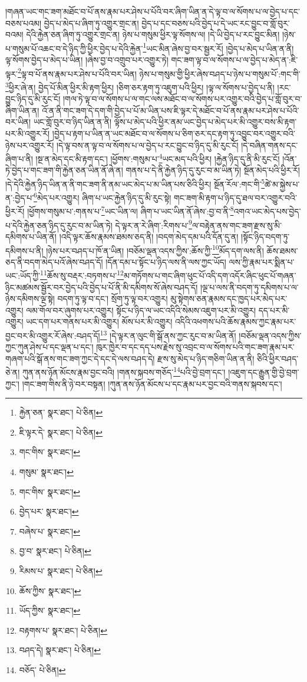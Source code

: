 །གཞན་ཡང་གང་ཟག་མཐོང་བ་པོ་ནས་རྣམ་པར་ཤེས་པ་པོའི་བར་ཞིག་ཡིན་ན་དེ་ལྟ་བ་ལ་སོགས་པ་ལ་བྱེད་པ་དང་བཅས་པའམ། བྱེད་པ་མེད་པ་ཞིག་ཏུ་འགྱུར་གྲང་ན། བྱེད་པ་དང་བཅས་པའི་བྱེད་པ་དེ་ཡང་རང་བྱུང་བ་གློ་བུར་བའམ། དེའི་རྐྱེན་ཅན་ཞིག་ཏུ་འགྱུར་གྲང་ན། ཉེས་པ་གསུམ་ཕྱིར་ལྟ་སོགས་ལ། །དེ་ཡི་བྱེད་པ་རང་བྱུང་མིན། །ཉེས་པ་གསུམ་པོ་འཆང་བ་དེ་ཉིད་ཀྱི་ཕྱིར་བྱེད་པ་དེའི་རྐྱེན་\footnote{རྐྱེན་ཅན་  སྣར་ཐང་།  པེ་ཅིན། }ཡང་མིན་ཞེས་བྱ་བར་སྦྱར་རོ། །བྱེད་པ་མེད་པ་ཡིན་ན་ནི། ལྟ་སོགས་བྱེད་པ་མེད་པ་ཡིན། །ཞེས་བྱ་བ་འགྲུབ་པར་འགྱུར་ཏེ། གང་ཟག་ལྟ་བ་ལ་སོགས་པ་ལ་བྱེད་པ་མེད་ན་:ཇི་ལྟར་\footnote{ཇི་ལྟར་དེ་  སྣར་ཐང་།  པེ་ཅིན། }ལྟ་བ་པོ་ནས་རྣམ་པར་ཤེས་པ་པོའི་བར་ཡིན། ཉེས་པ་གསུམ་གྱི་ཕྱིར་ཞེས་བཤད་པ་ཉེས་པ་གསུམ་པོ་:གང་གི་\footnote{གང་གིས་  སྣར་ཐང་། }ཕྱིར་ཞེ་ན། བྱེད་པོ་མིན་ཕྱིར་མི་རྟག་ཕྱིར། །ཅིག་ཅར་རྟག་ཏུ་འཇུག་པའི་ཕྱིར། །ལྟ་ལ་སོགས་པ་བྱེད་པ་ནི། །རང་བྱུང་ཉིད་དུ་མི་རུང་ངོ། །གལ་ཏེ་ལྟ་བ་ལ་སོགས་པ་ལ་གང་ལས་མཐོང་བ་ལ་སོགས་པར་འགྱུར་བའི་བྱེད་པ་གློ་བུར་བ་ཞིག་ཡིན་ན། འོ་ན་ནི་གང་ཟག་དེ་དག་གི་བྱེད་པ་པོ་མ་ཡིན་པས་ཇི་ལྟར་དེ་མཐོང་བ་པོ་ནས་རྣམ་པར་ཤེས་པ་པོའི་བར་ཡིན། ཡང་གློ་བུར་བ་ཉིད་ཡིན་ན་ནི། ལྟོས་པ་མེད་པའི་ཕྱིར་ནམ་ཡང་བྱེད་པ་མེད་པར་མི་འགྱུར་བས་མི་རྟག་པར་མི་འགྱུར་རོ། །བྱེད་པ་རྟག་པ་ཡིན་ན་ཡང་མཐོང་བ་ལ་སོགས་པ་ཅིག་ཅར་དང་རྟག་ཏུ་འབྱུང་བར་འགྱུར་བའི་ཉེས་པར་འགྱུར་རོ། །དེ་ལྟ་བས་ན་ལྟ་བ་ལ་སོགས་པ་ལ་བྱེད་པ་རང་བྱུང་བ་ཉིད་དུ་མི་རུང་ངོ། །དེ་བཞིན་གནས་དང་ཞིག་པ་ནི། །སྔ་ན་མེད་དང་མི་རྟག་དང་། །ཕྱོགས་:གསུམ་པ་\footnote{གསུམ་  སྣར་ཐང་། }ཡང་མད་པའི་ཕྱིར། །རྐྱེན་ཉིད་དུ་ནི་མི་རུང་ངོ། །འོན་ཏེ་བྱེད་པ་གང་ཟག་གི་རྐྱེན་ཅན་ཡིན་ནོ་ཞེ་ན། གནས་པ་དེ་ནི་རྐྱེན་ཉིད་དུ་རུང་བ་མ་ཡིན་ཏེ། སྔོན་མེད་པའི་ཕྱིར་རོ། །དེ་དེའི་རྐྱེན་ཉིད་ཡིན་ན་ནི་གང་ཟག་ནི་ནམ་ཡང་མེད་པ་མ་ཡིན་པས་ཅིའི་ཕྱིར། སྔོན་རོལ་:གང་གི་\footnote{གང་གིས་  སྣར་ཐང་། }ཚེ་མ་སྐྱེས་པ་ན་:བྱེད་པ་\footnote{བྱེད་པར་  སྣར་ཐང་། }མེད་པར་འགྱུར། ཞིག་པ་ཡང་རྐྱེན་ཉིད་དུ་མི་རུང་སྟེ། གང་ཟག་མི་རྟག་པ་ཉིད་དུ་ཐལ་བར་འགྱུར་བའི་ཕྱིར་རོ། །ཕྱོགས་གསུམ་པ་:གནས་པ་\footnote{བཞེས་པ་  སྣར་ཐང་། }ཡང་ཡིན་ལ། ཞིག་པ་ཡང་ཡིན་ནོ་ཞེས་:བྱ་བ་ནི་\footnote{བྱ་བ་  སྣར་ཐང་།  པེ་ཅིན། }འགའ་ཡང་མེད་པས་བྱེད་པ་དེའི་རྐྱེན་ཅན་ཉིད་དུ་རུང་བ་མ་ཡིན་ཏེ། དེ་ལྟར་ན་རེ་ཞིག་:རིགས་པ་\footnote{རིམས་པ་  སྣར་ཐང་།  པེ་ཅིན། }ལ་བརྟེན་ནས་གང་ཟག་རྫས་སུ་མི་དམིགས་པ་ཡིན་ནོ། །འདི་ལྟར་ཆོས་རྣམས་ཐམས་ཅད་ནི། །བདག་མེད་དམ་པའི་དོན་དུ་ན། །སྟོང་ཉིད་བདག་ཏུ་དམིགས་པ་ནི། །ཉེས་པར་བཤད་པ་ཁོ་ན་ཡིན། །བཅོམ་ལྡན་འདས་ཀྱིས་:ཆོས་ཀྱི་\footnote{ཆོས་ཀྱིས་  སྣར་ཐང་། }མོད་དག་ལས་ནི། ཆོས་ཐམས་ཅད་ནི་བདག་མེད་པའོ་ཞེས་བཤད་དོ། །དོན་དམ་པ་སྟོང་པ་ཉིད་ལས་ནི་ལས་ཀྱང་ཡོད། ལས་ཀྱི་རྣམ་པར་སྨིན་པ་ཡང་:ཡོད་ཀྱི་\footnote{ཡོད་ཀྱིས་  སྣར་ཐང་། }ཆོས་སུ་བརྡར་:བཏགས་པ་\footnote{བརྟགས་པ་  སྣར་ཐང་།  པེ་ཅིན། }མ་གཏོགས་པ་གང་ཞིག་ཕུང་པོ་འདི་དག་འདོར་ཞིང་ཕུང་པོ་གཞན་ཉིང་མཚམས་སྦྱོར་བར་བྱེད་པའི་བྱེད་པ་པོ་ནི་མི་དམིགས་སོ་ཞེས་བཤད་དོ། །ལྔ་པ་ལས་ནི་བདག་ཏུ་དམིགས་པ་ལ་ཉེས་དམིགས་ལྔ་སྟེ། བདག་ཏུ་ལྟ་བ་དང་། སྲོག་ཏུ་ལྟ་བར་འགྱུར། མུ་སྟེགས་ཅན་རྣམས་དང་ཁྱད་པར་མེད་པར་འགྱུར། ལམ་གོལ་བར་ཞུགས་པར་འགྱུར། སྟོང་པ་ཉིད་ལ་ཡང་འདིའི་སེམས་འཇུག་པར་མི་འགྱུར། དད་པར་མི་འགྱུར། ཡང་དག་པར་གནས་པར་མི་འགྱུར། མོས་པར་མི་འགྱུར། འདིའི་འཕགས་པའི་ཆོས་རྣམས་ཀྱང་རྣམ་པར་བྱང་བར་མི་འགྱུར་རོ་ཞེས་:བཤད་དོ།\footnote{བཤད་དེ།  སྣར་ཐང་།  པེ་ཅིན། } །དེ་ལྟར་ན་ལུང་གི་སྒོ་ནས་ཀྱང་རུང་བ་མ་ཡིན་ནོ། །བཅོམ་ལྡན་འདས་ཀྱིས་ཀྱང་ཀུན་ཤེས་པ་དང་ལྡན་པ་དང་། ཁུར་ཁྱེར་བ་དང་དད་པས་རྗེས་སུ་འབྲང་བ་ལ་སོགས་པའི་གང་ཟག་རྣམ་པར་གཞག་པའི་སྒོ་ནས་གང་ཟག་ཀྱང་དེ་དང་དེ་ལས་བཤད་དེ། རྫས་སུ་མེད་པ་ཉིད་གཅིག་ཡིན་ན་ནི། ཅིའི་ཕྱིར་བཤད་ཅེ་ན། ཀུན་ནས་ཉོན་མོངས་རྣམ་བྱང་བའི། །གནས་སྐབས་གཅོད་\footnote{བཅོད་  པེ་ཅིན། }པའི་བྱེ་བྲག་དང་། །འཇུག་དང་རྒྱུན་གྱི་བྱེ་བྲག་ཀྱང་། །གང་ཟག་གིས་ནི་ཉེ་བར་བསྟན། །ཀུན་ནས་ཉོན་མོངས་པ་དང་རྣམ་པར་བྱང་བའི་གནས་སྐབས་དང་། 